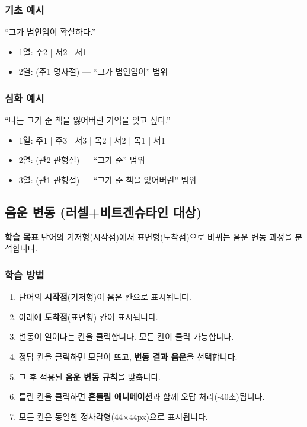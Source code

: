 \documentclass[11pt,a4paper]{article}
\newcommand{\goalbox}[1]{%
  \vspace{0.3cm}
  \noindent\colorbox{lightbg}{\parbox{\dimexpr\textwidth-2\fboxsep}{%
    \textbf{\color{korfarm}학습 목표} \quad #1%
  }}
  \vspace{0.3cm}
}
\begin{document}
\subsubsection{기초 예시}
``그가 범인임이 확실하다.''
\begin{itemize}[nosep,leftmargin=*]
  \item 1열: 주2 | 서2 | 서1
  \item 2열: (주1 명사절) — ``그가 범인임이'' 범위
\end{itemize}

\subsubsection{심화 예시}
``나는 그가 준 책을 잃어버린 기억을 잊고 싶다.''
\begin{itemize}[nosep,leftmargin=*]
  \item 1열: 주1 | 주3 | 서3 | 목2 | 서2 | 목1 | 서1
  \item 2열: (관2 관형절) — ``그가 준'' 범위
  \item 3열: (관1 관형절) — ``그가 준 책을 잃어버린'' 범위
\end{itemize}

\newpage
\subsection{음운 변동 (러셀+비트겐슈타인 대상)}
\goalbox{단어의 기저형(시작점)에서 표면형(도착점)으로 바뀌는 음운 변동 과정을 분석합니다.}

\subsubsection{학습 방법}
\begin{enumerate}[nosep,leftmargin=*]
  \item 단어의 \textbf{시작점}(기저형)이 음운 칸으로 표시됩니다.
  \item 아래에 \textbf{도착점}(표면형) 칸이 표시됩니다.
  \item 변동이 일어나는 칸을 클릭합니다. 모든 칸이 클릭 가능합니다.
  \item 정답 칸을 클릭하면 모달이 뜨고, \textbf{변동 결과 음운}을 선택합니다.
  \item 그 후 적용된 \textbf{음운 변동 규칙}을 맞춥니다.
  \item 틀린 칸을 클릭하면 \textbf{흔들림 애니메이션}과 함께 오답 처리(-40초)됩니다.
  \item 모든 칸은 동일한 정사각형(44×44px)으로 표시됩니다.
\end{enumerate}
\end{document}
